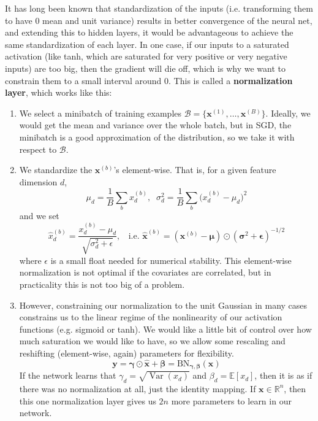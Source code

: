 \documentclass{article}
\DeclareMathOperator{\Var}{Var}
\theoremstyle{definition}
\theoremstyle{remark}
\theoremstyle{definition}
\begin{document}
      It has long been known that standardization of the inputs (i.e. transforming them to have $0$ mean and unit variance) results in better convergence of the neural net, and extending this to hidden layers, it would be advantageous to achieve the same standardization of each layer. In one case, if our inputs to a saturated activation (like tanh, which are saturated for very positive or very negative inputs) are too big, then the gradient will die off, which is why we want to constrain them to a small interval around $0$. This is called a \textbf{normalization layer}, which works like this: 
      \begin{enumerate}
          \item We select a minibatch of training examples $\mathcal{B} = \{\mathbf{x}^{(1)}, \ldots, \mathbf{x}^{(B)}\}$. Ideally, we would get the mean and variance over the whole batch, but in SGD, the minibatch is a good approximation of the distribution, so we take it with respect to $\mathcal{B}$. 
          
          \item We standardize the $\mathbf{x}^{(b)}$'s element-wise. That is, for a given feature dimension $d$, 
          \[\mu_d = \frac{1}{B} \sum_b x^{(b)}_d, \;\; \sigma^2_d = \frac{1}{B} \sum_{b} \big(x^{(b)}_d - \mu_d \big)^2\]
          and we set 
          \[\hat{x}_d^{(b)} = \frac{x_d^{(b)} - \mu_d}{\sqrt{\sigma^2_d + \epsilon}}, \;\; \text{ i.e. } \hat{\mathbf{x}}^{(b)} = (\mathbf{x}^{(b)} - \boldsymbol{\mu}) \odot (\boldsymbol{\sigma}^2 + \boldsymbol{\epsilon})^{-1/2}\]
          where $\epsilon$ is a small float needed for numerical stability. 
          This element-wise normalization is not optimal if the covariates are correlated, but in practicality this is not too big of a problem. 

          \item However, constraining our normalization to the unit Gaussian in many cases constrains us to the linear regime of the nonlinearity of our activation functions (e.g. sigmoid or tanh). We would like a little bit of control over how much saturation we would like to have, so we allow some rescaling and reshifting (element-wise, again) parameters for flexibility. 
          \[\mathbf{y} = \boldsymbol{\gamma} \odot \hat{\mathbf{x}} + \boldsymbol{\beta} = \mathrm{BN}_{\boldsymbol{\gamma}, \boldsymbol{\beta}} (\mathbf{x})\]
          If the network learns that $\gamma_d = \sqrt{\Var(x_d)}$ and $\beta_d = \mathbb{E}[x_d]$, then it is as if there was no normalization at all, just the identity mapping. If $\mathbf{x} \in \mathbb{R}^n$, then this one normalization layer gives us $2n$ more parameters to learn in our network. 
      \end{enumerate}
\end{document}
